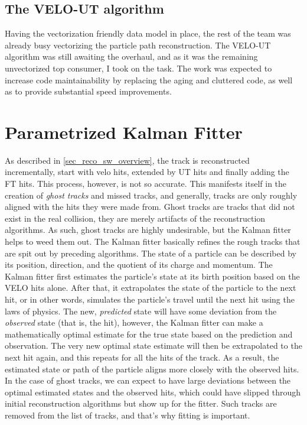 \documentclass[12pt]{article}
\begin{document}
\subsection{The VELO-UT algorithm}

Having the vectorization friendly data model in place, the rest of the team was already busy vectorizing the particle path reconstruction. The VELO-UT algorithm was still awaiting the overhaul, and as it was the remaining unvectorized top consumer, I took on the task. The work was expected to increase code maintainability by replacing the aging and cluttered code, as well as to provide substantial speed improvements.


\newpage
\section{Parametrized Kalman Fitter}\label{sec_kalman_main}

As described in \ref{sec_reco_sw_overview}, the track is reconstructed incrementally, start with velo hits, extended by UT hits and finally adding the FT hits. This process, however, is not so accurate. This manifests itself in the creation of \textit{ghost tracks} and missed tracks, and generally, tracks are only roughly aligned with the hits they were made from. Ghost tracks are tracks that did not exist in the real collision, they are merely artifacts of the reconstruction algorithms. As such, ghost tracks are highly undesirable, but the Kalman fitter helps to weed them out. 
The Kalman fitter basically refines the rough tracks that are spit out by preceding algorithms. The state of a particle can be described by its position, direction, and the quotient of its charge and momentum. The Kalman fitter first estimates the particle's state at its birth position based on the VELO hits alone. After that, it extrapolates the state of the particle to the next hit, or in other words, simulates the particle's travel until the next hit using the laws of physics. The new, \textit{predicted} state will have some deviation from the \textit{observed} state (that is, the hit), however, the Kalman fitter can make a mathematically optimal estimate for the true state based on the prediction and observation. The very new optimal state estimate will then be extrapolated to the next hit again, and this repeats for all the hits of the track.
As a result, the estimated state or path of the particle aligns more closely with the observed hits. In the case of ghost tracks, we can expect to have large deviations between the optimal estimated states and the observed hits, which could have slipped through initial reconstruction algorithms but show up for the fitter. Such tracks are removed from the list of tracks, and that's why fitting is important.
\end{document}

